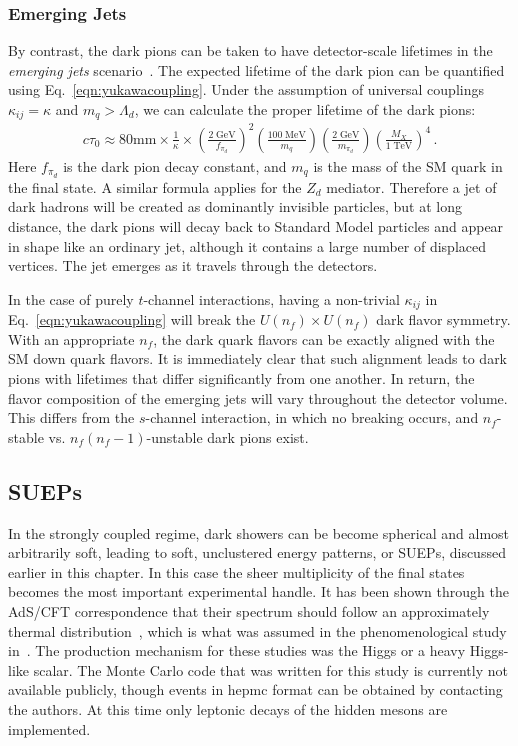 \subsubsection{Emerging Jets}
By contrast, the dark pions can be taken to have detector-scale lifetimes in the {\em emerging jets} scenario~\cite{Schwaller:2015gea}. The expected lifetime of the dark pion can be quantified using Eq.~\ref{eqn:yukawacoupling}. Under the assumption of universal couplings $\kappa_{ij} = \kappa$ and $m_{q} > \Lambda_{d}$, we can calculate the proper lifetime of the dark pions:
%
\begin{align}
	c \tau_{0} \approx 80 \mathrm{mm} \times \frac{1}{\kappa} \times \left( \frac{2 \;\mathrm{GeV}}{f_{\pi_{d}}} \right)^2 \left( \frac{100 \;\mathrm{MeV}}{m_{q}} \right) \left( \frac{2\; \mathrm{GeV}}{m_{\pi_{d} }} \right) \left( \frac{M_{X}}{1 \;\mathrm{TeV}} \right)^4 \,.
\end{align}
Here $f_{\pi_{d}}$ is the dark pion decay constant, and $m_q$ is the mass of the SM quark in the final state.  A similar formula applies for the $Z_d$ mediator. Therefore a jet of dark hadrons will be created as dominantly invisible particles, but at long distance, the dark pions will decay back to Standard Model particles and appear in shape like an ordinary jet, although it contains a large number of displaced vertices. The jet emerges as it travels through the detectors.


In the case of purely $t$-channel interactions, having a non-trivial $\kappa_{ij}$ in Eq.~\ref{eqn:yukawacoupling} will break the $U(n_{f}) \times U(n_{f})$ dark flavor symmetry. With an appropriate $n_{f}$, the dark quark flavors can be exactly aligned with the SM down quark flavors. It is immediately clear that such alignment leads to dark pions with lifetimes that differ significantly from one another. In return, the flavor composition of the emerging jets will vary throughout the detector volume. This differs from the $s$-channel interaction, in which no breaking occurs, and $n_{f}$-stable vs. $n_{f}(n_{f} - 1)$-unstable dark pions exist.

\subsection{SUEPs}
In the strongly coupled regime, dark showers can be become spherical and almost arbitrarily soft, leading to soft, unclustered energy patterns, or SUEPs, discussed earlier in this chapter. In this case the sheer multiplicity of the final states becomes the most important experimental handle. It has been shown through the AdS/CFT correspondence that their spectrum should follow an approximately thermal distribution~\cite{Hatta:2008qx}, which is what was assumed in the phenomenological study in~\cite{Knapen:2016hky}. The production mechanism for these studies was the Higgs or a heavy Higgs-like scalar. The Monte Carlo code that was written for this study is currently not available publicly, though events in hepmc format can be obtained by contacting the authors. At this time only leptonic decays of the hidden mesons are implemented.
